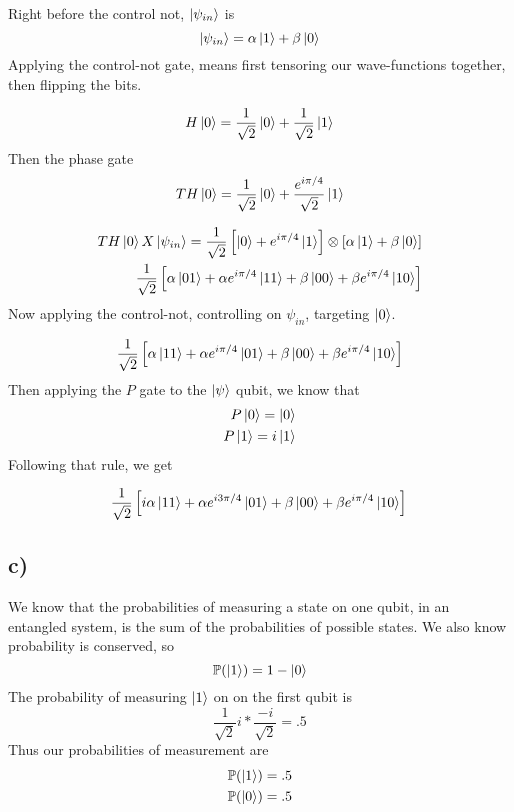 \documentclass[]{article}
\begin{document}
Right before the control not, \(\ket{\psi_{in}}\) is \[
\ket{\psi_{in}}  =\alpha \ket{1} +\beta \ket{0} 
\] Applying the control-not gate, means first tensoring our
wave-functions together, then flipping the bits.

\[
H\ket{0} = \frac{1}{\sqrt{ 2 }}\ket{0} + \frac{1}{\sqrt{ 2 }}\ket{1}  
\] Then the phase gate \[
TH\ket{0} = \frac{1}{\sqrt{ 2 }}\ket{0} +\frac{e^{ i\pi/4 }}{\sqrt{ 2 }}\ket{1}  
\]

\[
\begin{align}
TH\ket{0} X\ket{\psi_{in}}  = \frac{1}{\sqrt{ 2 }}\left[ \ket{0} +e^{ i\pi/4 }\ket{1}  \right] \otimes \left[ \alpha \ket{1} +\beta \ket{0} \right]  \\
\frac{1}{\sqrt{ 2 }}\left[ \alpha \ket{01} +\alpha e^{ i\pi/4 }\ket{11} +\beta \ket{00} +\beta e^{ i\pi/4 }\ket{10}  \right] 
\end{align}
\] Now applying the control-not, controlling on \(\psi_{in}\), targeting
\(\ket{0}\).

\[
\begin{align}
\frac{1}{\sqrt{ 2 } }\left[ \alpha \ket{11} +\alpha e^{ i\pi/4 }\ket{01}+\beta \ket{00} +\beta e^{ i\pi/4 }\ket{10}   \right] \\
\end{align}
\] Then applying the \(P\) gate to the \(\ket{\psi}\) qubit, we know
that \[
\begin{align}
P\ket{0}  = \ket{0}  \\
P\ket{1}  = i\ket{1}  
\end{align}
\] Following that rule, we get

\[
\frac{1}{\sqrt{ 2 } }\left[ i\alpha  \ket{11} +\alpha e^{ i 3\pi/4 }\ket{01}+\beta \ket{00} +\beta e^{ i\pi/4 }\ket{10}   \right] \\
\]

\hypertarget{c-1}{%
\subsection{c)}\label{c-1}}

We know that the probabilities of measuring a state on one qubit, in an
entangled system, is the sum of the probabilities of possible states. We
also know probability is conserved, so \[
\mathbb{P}(\ket{1} ) = 1-\ket{0} 
\] The probability of measuring \(\ket{1}\) on on the first qubit is \[
\frac{1}{\sqrt{ 2 }}i* \frac{-i}{\sqrt{ 2 }} = .5
\] Thus our probabilities of measurement are \[
\begin{align}
\mathbb{P}(\ket{1} ) =.5 \\
\mathbb{P}(\ket{0} ) =.5 
\end{align}
\]
\end{document}
